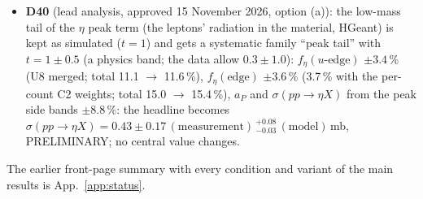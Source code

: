 \documentclass[11pt,a4paper]{article}
\newcommand{\aP}{\ensuremath{a_P}\xspace}
\newcommand{\sigeta}{\ensuremath{\sigma(pp\to\eta X)}\xspace}
\begin{document}
\begin{itemize}
      (data test $k_{\mathrm{cross}}=1.00\pm0.39$; independent, with the constant C2 factor, $0.96\pm0.48$); the caveat ``up to $+8$\,\%'' is replaced by the flip limit
      ($<+1.6$\,\% on $f$; $<+1.9$\,\% for either charge) and the $k_{\mathrm{cross}}$ check ($0.0\pm1.2$\,\%); no headline number changes.
\item \textbf{D40} (lead analysis, approved 15 November 2026, option (a)): the low-mass tail of the $\eta$ peak term (the leptons'
      radiation in the material, HGeant) is kept as simulated ($t=1$) and gets a systematic family ``peak tail'' with $t=1\pm0.5$ (a physics
      band; the data allow $0.3\pm1.0$): $f_\eta(u\text{-edge})$ $\pm3.4$\,\% (U8 merged; total 11.1 $\to$ 11.6\,\%), $f_\eta(\mathrm{edge})$
      $\pm3.6$\,\% (3.7\,\% with the per-count C2 weights; total 15.0 $\to$ 15.4\,\%), \aP and \sigeta from the peak side bands $\pm8.8$\,\%: the
      headline becomes $\sigeta=0.43\pm0.17\,(\mathrm{measurement})\,^{+0.08}_{-0.03}\,(\mathrm{model})$\,mb, PRELIMINARY; no central value changes.
\end{itemize}
The earlier front-page summary with every condition and variant of the main results is App.~\ref{app:status}.

\par\ifdim\dimexpr\pagegoal-\pagetotal\relax<8\baselineskip\newpage\fi%
\end{document}

